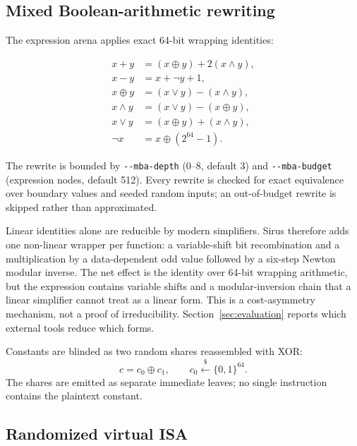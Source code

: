 \subsection{Mixed Boolean-arithmetic rewriting}

The expression arena applies exact 64-bit wrapping identities:

\begin{align}
  x + y &= (x \oplus y) + 2(x \land y), \label{eq:mba-add}\\
  x - y &= x + \lnot y + 1, \label{eq:mba-sub}\\
  x \oplus y &= (x \lor y) - (x \land y), \label{eq:mba-xor}\\
  x \land y &= (x \lor y) - (x \oplus y), \label{eq:mba-and}\\
  x \lor y &= (x \oplus y) + (x \land y), \label{eq:mba-or}\\
  \lnot x &= x \oplus (2^{64}-1). \label{eq:mba-not}
\end{align}

The rewrite is bounded by \verb|--mba-depth| (0--8, default 3) and
\verb|--mba-budget| (expression nodes, default 512). Every rewrite is checked
for exact equivalence over boundary values and seeded random inputs; an
out-of-budget rewrite is skipped rather than approximated.

Linear identities alone are reducible by modern simplifiers. Sirus therefore
adds one non-linear wrapper per function: a variable-shift bit recombination and
a multiplication by a data-dependent odd value followed by a six-step Newton
modular inverse. The net effect is the identity over 64-bit wrapping arithmetic,
but the expression contains variable shifts and a modular-inversion chain that a
linear simplifier cannot treat as a linear form. This is a cost-asymmetry
mechanism, not a proof of irreducibility. Section~\ref{sec:evaluation} reports
which external tools reduce which forms.

Constants are blinded as two random shares reassembled with XOR:
\begin{equation}
  c = c_0 \oplus c_1, \qquad c_0 \xleftarrow{\$} \{0,1\}^{64}.
  \label{eq:blinding}
\end{equation}
The shares are emitted as separate immediate leaves; no single instruction
contains the plaintext constant.

\subsection{Randomized virtual ISA}

